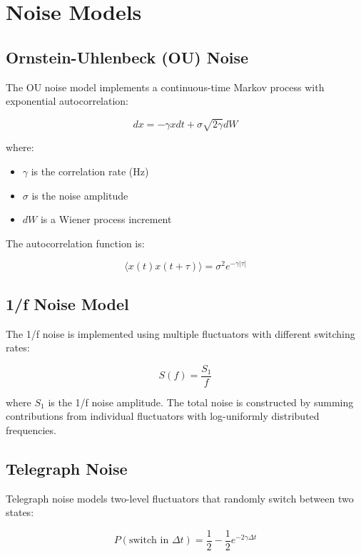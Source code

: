 \documentclass{article}
\begin{document}
\section{Noise Models}

\subsection{Ornstein-Uhlenbeck (OU) Noise}

The OU noise model implements a continuous-time Markov process with exponential autocorrelation:

\begin{equation}
dx = -\gamma x dt + \sigma \sqrt{2\gamma} dW
\end{equation}

where:
\begin{itemize}
\item $\gamma$ is the correlation rate (Hz)
\item $\sigma$ is the noise amplitude
\item $dW$ is a Wiener process increment
\end{itemize}

The autocorrelation function is:

\begin{equation}
\langle x(t) x(t+\tau) \rangle = \sigma^2 e^{-\gamma|\tau|}
\end{equation}

\subsection{1/f Noise Model}

The 1/f noise is implemented using multiple fluctuators with different switching rates:

\begin{equation}
S(f) = \frac{S_1}{f}
\end{equation}

where $S_1$ is the 1/f noise amplitude. The total noise is constructed by summing contributions from individual fluctuators with log-uniformly distributed frequencies.

\subsection{Telegraph Noise}

Telegraph noise models two-level fluctuators that randomly switch between two states:

\begin{equation}
P(\text{switch in } \Delta t) = \frac{1}{2} - \frac{1}{2} e^{-2\gamma \Delta t}
\end{equation}
\end{document}

